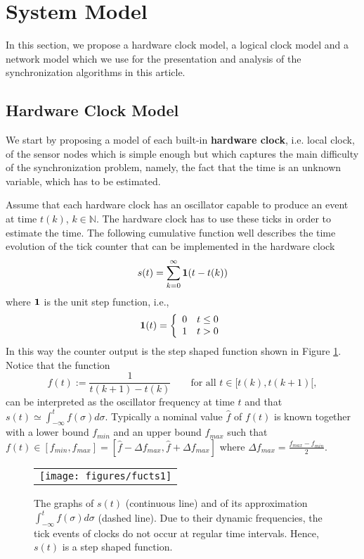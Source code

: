\documentclass[english,a4paper,10pt,final]{article}
\numberwithin{equation}{section}
\numberwithin{figure}{section}
\begin{document}
\section{System Model}

\label{sec:System-Model}

In this section, we propose a hardware clock model, a logical clock model and a network model which we use for the presentation and analysis of the synchronization algorithms in this article.

\subsection{Hardware Clock Model}

We start by proposing a model of each built-in \textbf{hardware clock}, i.e. local clock, of the sensor nodes which is simple enough but which captures the main difficulty of the synchronization problem, namely, the fact that the time is an unknown variable, which has to be estimated. 

Assume that each hardware clock has an oscillator capable to produce an event at time $t(k)$, $k\in \mathbb{N}$. The hardware clock has to use these ticks in order to estimate the time. The following cumulative function well describes the time evolution of the tick counter that can be implemented in the hardware clock
$$
s(t)=\sum_{k=0}^{\infty} {\bf{1}}(t-t(k))
$$  
where ${\bf{1}}$ is the unit step function, i.e.,
$$
{\bf{1}}(t)=
\left\{
\begin{array}{lc}
0 & t\le 0\\
1& t> 0
\end{array}
\right.
$$
In this way the counter output is the step shaped function shown in Figure \ref{fig:sdit}.
Notice that the function
\begin{equation}\label{eq:regular_f}
f(t):=\frac{1}{t(k+1)-t(k)}\qquad\mbox{for all $t\in[t(k),t(k+1)[$},
\end{equation}
can be interpreted as the oscillator frequency at time $t$ and that $s(t)\simeq\int_{-\infty}^t f(\sigma)d\sigma$. Typically a nominal value $\hat f$ of $f(t)$ is known together with a lower bound  
$f_{min}$ and an upper bound $f_{max}$ such that $f(t)\in[f_{min},f_{max}]=[\hat{f}-\Delta\! f_{max},\hat{f}+\Delta\! f_{max}]$ where $\Delta\! f_{max}=\frac{f_{max}-f_{min}}{2}$.

\begin{figure}
\begin{center}
\begin{tabular}{c}
\texttt{[image: figures/fucts1]}
\end{tabular}
\caption{\label{fig:sdit} The graphs of $s(t)$ (continuous line) and of its approximation $\int_{-\infty}^t f(\sigma)d\sigma$ (dashed line).  Due to their dynamic frequencies, the tick events of clocks do not occur at regular time intervals. Hence, $s(t)$ is a step shaped function.}
\end{center}
\end{figure}
\end{document}
